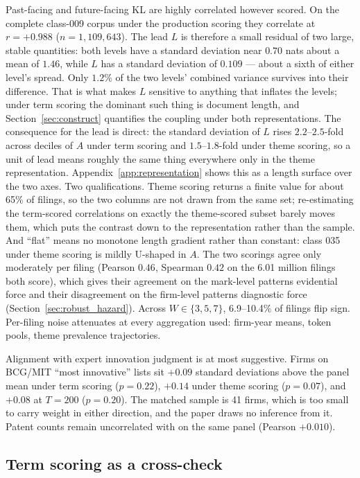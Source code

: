 Past-facing and future-facing KL are highly correlated however scored. On the
complete class-009 corpus under the production scoring they correlate at
$r = +0.988$ ($n = 1{,}109{,}643$). The lead $L$ is therefore a small residual
of two large, stable quantities: both levels have a standard deviation near
$0.70$ nats about a mean of $1.46$, while $L$ has a standard deviation of
$0.109$ --- about a sixth of either level's spread. Only $1.2\%$ of the two
levels' combined variance survives into their difference. That is what makes $L$ sensitive to
anything that inflates the levels; under term scoring the dominant such
thing is document length, and Section~\ref{sec:construct} quantifies the
coupling under both representations. The consequence for the lead is
direct: the standard deviation
of $L$ rises $2.2$--$2.5$-fold across deciles of $A$ under term scoring
and $1.5$--$1.8$-fold under theme scoring, so a unit of lead means roughly
the same thing everywhere only in the theme representation.
Appendix~\ref{app:representation} shows this as a length surface over the
two axes. Two qualifications. Theme scoring returns a finite value for about 65\% of
filings, so the two columns are not drawn from the same set; re-estimating the
term-scored correlations on exactly the theme-scored subset barely moves them,
which puts the contrast down to the representation rather than the sample.
And ``flat'' means no
monotone length gradient rather than constant: class 035 under theme
scoring is mildly U-shaped in $A$. The two scorings agree only
moderately per filing (Pearson $0.46$, Spearman $0.42$ on the 6.01 million
filings both score), which gives their agreement on the mark-level
patterns evidential force and their disagreement on the firm-level
patterns diagnostic force (Section~\ref{sec:robust_hazard}). Across
$W \in \{3, 5, 7\}$, 6.9--10.4\% of filings flip sign. Per-filing noise
attenuates at every aggregation used: firm-year means, token pools,
theme prevalence trajectories.

Alignment with expert innovation judgment is at most suggestive. Firms on
BCG/MIT ``most innovative'' lists sit $+0.09$ standard deviations above the panel mean
under term scoring ($p = 0.22$), $+0.14$ under theme scoring
($p = 0.07$), and $+0.08$ at $T = 200$ ($p = 0.20$). The matched
sample is 41 firms, which is too small to carry weight in either
direction, and the paper draws no inference from it. Patent counts remain
uncorrelated with \dkl{} on the same panel (Pearson $+0.010$).

\subsection{Term scoring as a cross-check}\label{app:scoring}

